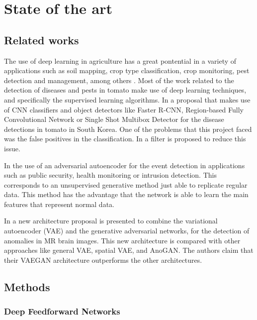 \chapter{State of the art}
\label{ch:marco}

\section{Related works}

The use of deep learning in agriculture has a great pontential in a variety of applications such as soil mapping, crop type classification, crop monitoring, pest detection and management, among others \cite{Kamilaris}. Most of the work related to the detection of diseases and pests in tomato make use of deep learning techniques, and specifically the supervised learning algorithms. In \cite{Fuentes2017_2} a proposal that makes use of CNN classifiers and object detectors like Faster R-CNN, Region-based Fully Convolutional Network or Single Shot Multibox Detector for the disease detections in tomato in South Korea. One of the problems that this project faced was the false positives in the classification. In \cite{Fuentes2018} a filter is proposed to reduce this issue.

In \cite{AsimeniaDimokranitou2017} the use of an adversarial autoencoder for the event detection in applications such as public security, health monitoring or intrusion detection. This corresponds to an unsupervised generative method just able to replicate regular data. This method has the advantage that the network is able to learn the main features that represent normal data.

In \cite{Baur2019} a new architecture proposal is presented to combine the variational autoencoder (VAE) and the generative adversarial networks, for the detection of anomalies in MR brain images. This new architecture is compared with other approaches like general VAE, spatial VAE, and AnoGAN. The authors claim that their VAEGAN architecture outperforms the other architectures.

\section{Methods}

\subsection{Deep Feedforward Networks}

